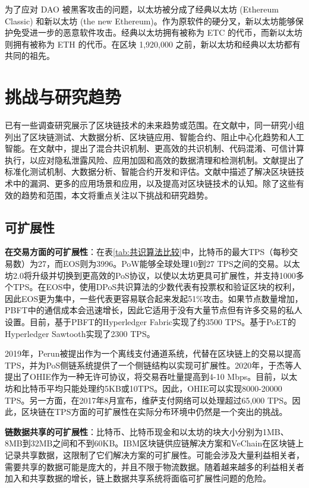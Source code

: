\begin{translation}
为了应对 DAO 被黑客攻击的问题，以太坊被分成了经典以太坊 (Ethereum Classic) 和新以太坊 (the new Ethereum)。作为原软件的硬分叉，新以太坊能够保护免受进一步的恶意软件攻击。经典以太坊拥有被称为 ETC 的代币，而新以太坊则拥有被称为 ETH 的代币。在区块 1,920,000 之前，新以太坊和经典以太坊都有共同的祖先。

\section{挑战与研究趋势}
已有一些调查研究展示了区块链技术的未来趋势或范围。在文献\cite{art3,art27}中，同一研究小组列出了区块链测试、大数据分析、区块链应用、智能合约、阻止中心化趋势和人工智能。在文献\cite{art29}中，提出了混合共识机制、更高效的共识机制、代码混淆、可信计算执行，以应对隐私泄露风险、应用加固和高效的数据清理和检测机制。文献\cite{art45}提出了标准化测试机制、大数据分析、智能合约开发和评估。文献\cite{art44}中描述了解决区块链技术中的漏洞、更多的应用场景和应用，以及提高对区块链技术的认知。除了这些有效的趋势和范围，本文将重点关注以下挑战和研究趋势。

\subsection{可扩展性}
\textbf{在交易方面的可扩展性}：在表\ref{tab:共识算法比较}中，比特币的最大TPS（每秒交易数）为27，而EOS则为3996。PoW能够全球处理10到27 TPS之间的交易。以太坊2.0将升级并切换到更高效的PoS协议，以使以太坊更具可扩展性，并支持1000多个TPS\cite{art127}。在EOS中，使用DPoS共识算法的少数代表有投票权和验证区块的权利，因此EOS更为集中，一些代表更容易联合起来发起51\%攻击。如果节点数量增加，PBFT中的通信成本会迅速增长，因此它适用于没有大量节点但有许多交易的私人设置。目前，基于PBFT的Hyperledger Fabric实现了约3500 TPS。基于PoET的Hyperledger Sawtooth实现了2300 TPS。

2019年，Perun被提出作为一个离线支付通道系统，代替在区块链上的交易以提高TPS\cite{art128}，并为PoS侧链系统提供了一个侧链结构以实现可扩展性\cite{art129}。2020年，于杰等人提出了OHIE作为一种无许可协议，将交易吞吐量提高到4-10 Mbps\cite{art130}。目前，以太坊和比特币平均只能处理约5KB或10TPS。因此，OHIE可以实现8000-20000 TPS。另一方面，在2017年8月宣布，维萨支付网络可以处理超过65,000 TPS\cite{art131}。因此，区块链在TPS方面的可扩展性在实际分布环境中仍然是一个突出的挑战。

\textbf{链数据共享的可扩展性}：比特币、比特币现金和以太坊的块大小分别为1MB、8MB到32MB之间和不到60KB。IBM区块链供应链解决方案\cite{art132}和VeChain\cite{art133}在区块链上记录共享数据，这限制了它们解决方案的可扩展性。可能会涉及大量利益相关者，需要共享的数据可能是庞大的，并且不限于物流数据。随着越来越多的利益相关者加入和共享数据的增长，链上数据共享系统将面临可扩展性问题的危险。


\end{translation}
